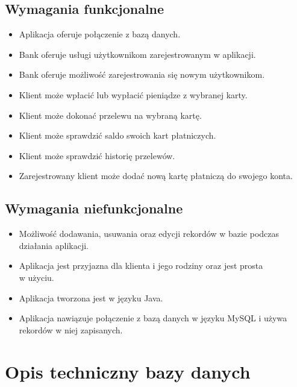 \documentclass[12pt, letterpaper]{article}
\begin{document}
\subsection{Wymagania funkcjonalne}
\begin{itemize}
\item Aplikacja oferuje połączenie z bazą danych.
\item Bank oferuje usługi użytkownikom zarejestrowanym w aplikacji.
\item Bank oferuje możliwość zarejestrowania się nowym użytkownikom.
\item Klient może wpłacić lub wypłacić pieniądze z wybranej karty.
\item Klient może dokonać przelewu na wybraną kartę.
\item Klient może sprawdzić saldo swoich kart płatniczych.
\item Klient może sprawdzić historię przelewów.
\item Zarejestrowany klient może dodać nową kartę płatniczą do swojego konta.
\end{itemize}

\newpage

\subsection{Wymagania niefunkcjonalne}
\begin{itemize}
\item Możliwość dodawania, usuwania oraz edycji rekordów w bazie podczas działania aplikacji.
\item Aplikacja jest przyjazna dla klienta i jego rodziny oraz jest prosta\\ w użyciu.
\item Aplikacja tworzona jest w języku Java.
\item Aplikacja nawiązuje połączenie z bazą danych w języku MySQL i używa rekordów w niej zapisanych.
\end{itemize}

\newpage

\section{Opis techniczny bazy danych}
\end{document}
